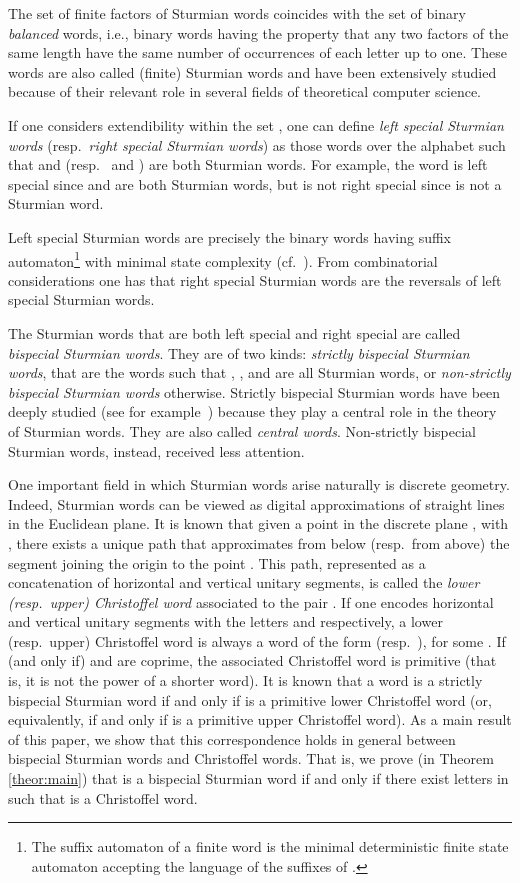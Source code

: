 \documentclass{llncs}
\begin{document}
The set  of finite factors of Sturmian words coincides with the set of binary \emph{balanced} words, i.e., binary words having the property that any two factors of the same length have the same number of occurrences of each letter up to one. These words are also called (finite) Sturmian words and have been extensively studied because of their relevant role in several fields of theoretical computer science.

If one considers extendibility within the set , one can define \emph{left special Sturmian words} (resp.~\emph{right special Sturmian words}) \cite{DelMi94} as those words  over the alphabet  such that  and  (resp.~ and ) are both Sturmian words. For example, the word  is left special since  and  are both Sturmian words, but is not right special since  is not a Sturmian word.

Left special Sturmian words are precisely the binary words having suffix automaton\footnote{The suffix automaton of a finite word  is the minimal deterministic finite state automaton accepting the language of the suffixes of .} with minimal state complexity (cf.~\cite{SciZa07,Fi10b}). From combinatorial considerations one has that right special Sturmian words are the reversals of left special Sturmian words.

The Sturmian words that are both left special and right special are called \emph{bispecial Sturmian words}. They are of two kinds: \emph{strictly bispecial Sturmian words}, that are the words  such that , ,  and  are all Sturmian words, or \emph{non-strictly bispecial Sturmian words} otherwise. Strictly bispecial Sturmian words have been deeply studied (see for example~\cite{DelMi94,CarDel05}) because they play a central role in the theory of Sturmian words. They are also called \emph{central words}. Non-strictly bispecial Sturmian words, instead, received less attention.

One important field in which Sturmian words arise naturally is discrete geometry. Indeed, Sturmian words can be viewed as digital approximations of straight lines in the Euclidean plane. It is known that given a point  in the discrete plane , with , there exists a unique path that approximates from below (resp.~from above) the segment joining the origin  to the point . This path, represented as a concatenation of horizontal and vertical unitary segments, is called the \emph{lower (resp.~upper) Christoffel word} associated to the pair . If one encodes horizontal and vertical unitary segments with the letters  and  respectively, a lower (resp.~upper) Christoffel word is always a word of the form  (resp.~), for some . If (and only if)  and  are coprime, the associated Christoffel word is primitive (that is, it is not the power of a shorter word). It is known that a word  is a strictly bispecial Sturmian word if and only if  is a primitive lower Christoffel word (or, equivalently, if and only if  is a primitive upper Christoffel word). As a main result of this paper, we show that this correspondence holds in general between bispecial Sturmian words and Christoffel words. That is, we prove (in Theorem \ref{theor:main}) that  is a bispecial Sturmian word if and only if there exist letters  in  such that  is a Christoffel word. 
\end{document}
